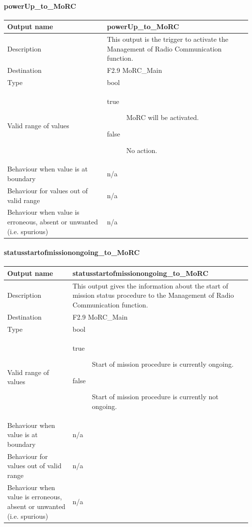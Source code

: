 \paragraph{powerUp\_to\_MoRC}

\begin{longtable}{p{}p{}}
\toprule
Output name				& powerUp\_to\_MoRC \\
\midrule
Description				& This output is the trigger to activate the Management of Radio Communication function. \\
\midrule
Destination				& F2.9 MoRC\_Main \\ 
\midrule
Type					& bool \\
\midrule
Valid range of values	& \begin{description}
\item[true]MoRC will be activated. 
\item[false]No action.
\end{description} \\
\midrule
Behaviour when value is at boundary	& n/a \\
\midrule
Behaviour for values out of valid range	& n/a \\
\midrule
Behaviour when value is erroneous, absent or unwanted (i.e. spurious) & n/a \\
\bottomrule
\end{longtable}

\paragraph{statusstartofmissionongoing\_to\_MoRC}

\begin{longtable}{p{}p{}}
\toprule
Output name				& statusstartofmissionongoing\_to\_MoRC \\
\midrule
Description				& This output gives the information about the start of mission status procedure to the Management of Radio Communication function. \\
\midrule
Destination				& F2.9 MoRC\_Main \\ 
\midrule
Type					& bool \\
\midrule
Valid range of values	& \begin{description}
\item[true]Start of mission procedure is currently ongoing.
\item[false]Start of mission procedure is currently not ongoing.
\end{description} \\
\midrule
Behaviour when value is at boundary	& n/a \\
\midrule
Behaviour for values out of valid range	& n/a \\
\midrule
Behaviour when value is erroneous, absent or unwanted (i.e. spurious) & n/a \\
\bottomrule
\end{longtable}


